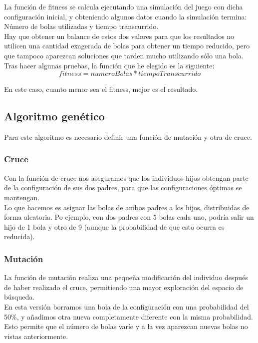 \documentclass[a4paper, 11pt]{article}
\begin{document}
		La función de fitness se calcula ejecutando una simulación del juego con dicha configuración inicial, y obteniendo algunos datos cuando la simulación termina: Número de bolas utilizadas y tiempo transcurrido. \\
		Hay que obtener un balance de estos dos valores para que los resultados no utilicen una cantidad exagerada de bolas para obtener un tiempo reducido, pero que tampoco aparezcan soluciones que tarden mucho utilizando sólo una bola. Tras hacer algunas pruebas, la función que he elegido es la siguiente:\\
		\begin{equation}
			fitness = numeroBolas * tiempoTranscurrido
		\end{equation}
		
		En este caso, cuanto menor sea el fitness, mejor es el resultado.

	\subsection{Algoritmo genético}
		
		Para este algoritmo es necesario definir una función de mutación y otra de cruce. 
				
		\subsubsection{Cruce}
			Con la función de cruce nos aseguramos que los individuos hijos obtengan parte de la configuración de sus dos padres, para que las configuraciones óptimas se mantengan. \\
			
			Lo que hacemos es asignar las bolas de ambos padres a los hijos, distribuidas de forma aleatoria. Po ejemplo, con dos padres con 5 bolas cada uno, podría salir un hijo de 1 bola y otro de 9 (aunque la probabilidad de que esto ocurra es reducida).
			
		\subsubsection{Mutación}
			La función de mutación realiza una pequeña modificación del individuo después de haber realizado el cruce, permitiendo una mayor exploración del espacio de búsqueda. \\
		
			En esta versión borramos una bola de la configuración con una probabilidad del 50\%, y añadimos otra nueva completamente diferente con la misma probabilidad. Esto permite que el número de bolas varíe y a la vez aparezcan nuevas bolas no vistas anteriormente.
			
\end{document}
